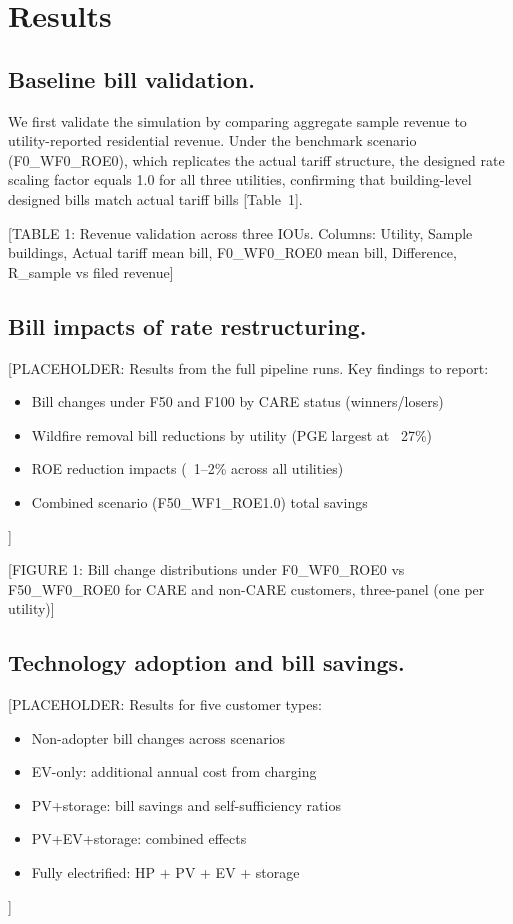 \documentclass[9pt,twocolumn,twoside]{pnas-new}
\begin{document}
\section*{Results}

\subsection*{Baseline bill validation.}
We first validate the simulation by comparing aggregate sample revenue to utility-reported residential revenue. Under the benchmark scenario (F0\_WF0\_ROE0), which replicates the actual tariff structure, the designed rate scaling factor equals 1.0 for all three utilities, confirming that building-level designed bills match actual tariff bills [Table~1].

[TABLE 1: Revenue validation across three IOUs. Columns: Utility, Sample buildings, Actual tariff mean bill, F0\_WF0\_ROE0 mean bill, Difference, R\_sample vs filed revenue]

\subsection*{Bill impacts of rate restructuring.}
[PLACEHOLDER: Results from the full pipeline runs. Key findings to report:
\begin{itemize}
    \item Bill changes under F50 and F100 by CARE status (winners/losers)
    \item Wildfire removal bill reductions by utility (PGE largest at ~27\%)
    \item ROE reduction impacts (~1--2\% across all utilities)
    \item Combined scenario (F50\_WF1\_ROE1.0) total savings
\end{itemize}
]

[FIGURE 1: Bill change distributions under F0\_WF0\_ROE0 vs F50\_WF0\_ROE0 for CARE and non-CARE customers, three-panel (one per utility)]

\subsection*{Technology adoption and bill savings.}
[PLACEHOLDER: Results for five customer types:
\begin{itemize}
    \item Non-adopter bill changes across scenarios
    \item EV-only: additional annual cost from charging
    \item PV+storage: bill savings and self-sufficiency ratios
    \item PV+EV+storage: combined effects
    \item Fully electrified: HP + PV + EV + storage
\end{itemize}
]
\end{document}
